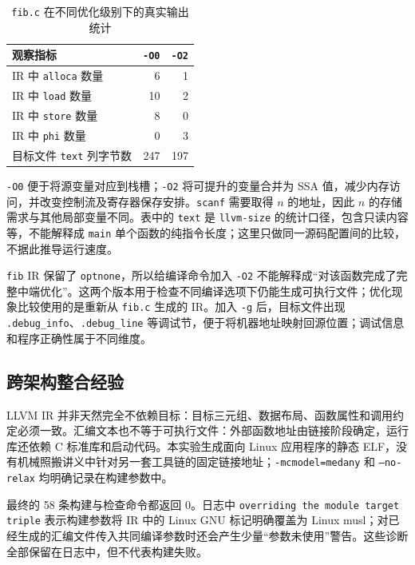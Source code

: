 \documentclass[UTF8,a4paper,10pt]{ctexart}
\begin{document}
\begin{table}[H]
  \centering
  \caption{\texttt{fib.c} 在不同优化级别下的真实输出统计}
  \begin{tabular}{lrr}
    \toprule
    观察指标 & \texttt{-O0} & \texttt{-O2} \\
    \midrule
    IR 中 \texttt{alloca} 数量 & 6 & 1 \\
    IR 中 \texttt{load} 数量 & 10 & 2 \\
    IR 中 \texttt{store} 数量 & 8 & 0 \\
    IR 中 \texttt{phi} 数量 & 0 & 3 \\
    目标文件 \texttt{text} 列字节数 & 247 & 197 \\
    \bottomrule
  \end{tabular}
\end{table}

\texttt{-O0} 便于将源变量对应到栈槽；\texttt{-O2} 将可提升的变量合并为 SSA 值，减少内存访问，并改变控制流及寄存器保存安排。\texttt{scanf} 需要取得 $n$ 的地址，因此 $n$ 的存储需求与其他局部变量不同。表中的 \texttt{text} 是 \texttt{llvm-size} 的统计口径，包含只读内容等，不能解释成 \texttt{main} 单个函数的纯指令长度；这里只做同一源码配置间的比较，不据此推导运行速度。

\texttt{fib} IR 保留了 \texttt{optnone}，所以给编译命令加入 \texttt{-O2} 不能解释成“对该函数完成了完整中端优化”。这两个版本用于检查不同编译选项下仍能生成可执行文件；优化现象比较使用的是重新从 \texttt{fib.c} 生成的 IR。加入 \texttt{-g} 后，目标文件出现 \texttt{.debug\_info}、\texttt{.debug\_line} 等调试节，便于将机器地址映射回源位置；调试信息和程序正确性属于不同维度。

\subsection{跨架构整合经验}

LLVM IR 并非天然完全不依赖目标：目标三元组、数据布局、函数属性和调用约定必须一致。汇编文本也不等于可执行文件：外部函数地址由链接阶段确定，运行库还依赖 C 标准库和启动代码。本实验生成面向 Linux 应用程序的静态 ELF，没有机械照搬讲义中针对另一套工具链的固定链接地址；\texttt{-mcmodel=medany} 和 \texttt{--no-relax} 均明确记录在构建参数中。

最终的 58 条构建与检查命令都返回 0。日志中 \texttt{overriding the module target triple} 表示构建参数将 IR 中的 Linux GNU 标记明确覆盖为 Linux musl；对已经生成的汇编文件传入共同编译参数时还会产生少量“参数未使用”警告。这些诊断全部保留在日志中，但不代表构建失败。
\end{document}
